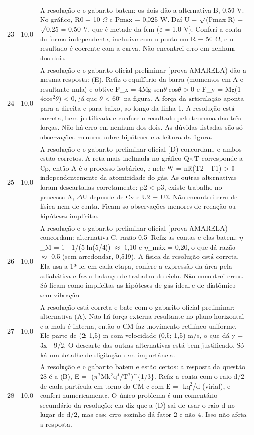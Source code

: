 \documentclass{article}%
\begin{document}
\begin{longtable}{@{}c c p{}@{}}
23 & 10,0 & A resolução e o gabarito batem: os dois dão a alternativa B, 0,50 V. No gráfico, R0 = 10 $\Omega$ e Pmax = 0,025 W. Daí U = $\surd$(Pmax$\cdot$R) = $\surd$0,25 = 0,50 V, que é metade da fem ($\varepsilon$ = 1,0 V). Conferi a conta de forma independente, inclusive com o ponto em R = 50 $\Omega$, e o resultado é coerente com a curva. Não encontrei erro em nenhum dos dois. \\
24 & 10,0 & A resolução e o gabarito oficial preliminar (prova AMARELA) dão a mesma resposta: (E). Refiz o equilíbrio da barra (momentos em A e resultante nula) e obtive F\_x = 4Mg sen$\theta$ cos$\theta$ > 0 e F\_y = Mg(1 - 4cos$^2$$\theta$) < 0, já que $\theta$ < 60$^\circ$ na figura. A força da articulação aponta para a direita e para baixo, ao longo da linha 1. A resolução está correta, bem justificada e confere o resultado pelo teorema das três forças. Não há erro em nenhum dos dois. As dúvidas listadas são só observações menores sobre hipóteses e a leitura da figura. \\
25 & 10,0 & A resolução e o gabarito preliminar oficial (D) concordam, e ambos estão corretos. A reta mais inclinada no gráfico Q$\times$T corresponde a Cp, então A é o processo isobárico, e nele W = nR(T2 - T1) > 0 independentemente da atomicidade do gás. As outras alternativas foram descartadas corretamente: p2 < p3, existe trabalho no processo A, $\Delta$U depende de Cv e U2 = U3. Não encontrei erro de física nem de conta. Ficam só observações menores de redação ou hipóteses implícitas. \\
26 & 10,0 & A resolução e o gabarito preliminar oficial (prova AMARELA) concordam: alternativa C, razão 0,5. Refiz as contas e elas batem: $\eta$\_M = 1 - 1/(5 ln(5/4)) $\approx$ 0,10 e $\eta$\_máx = 0,20, o que dá razão $\approx$ 0,5 (sem arredondar, 0,519). A física da resolução está correta. Ela usa a 1ª lei em cada etapa, confere a expressão da área pela adiabática e faz o balanço de trabalho do ciclo. Não encontrei erros. Só ficam como implícitas as hipóteses de gás ideal e de diatômico sem vibração. \\
27 & 10,0 & A resolução está correta e bate com o gabarito oficial preliminar: alternativa (A). Não há força externa resultante no plano horizontal e a mola é interna, então o CM faz movimento retilíneo uniforme. Ele parte de (2; 1,5) m com velocidade (0,5; 1,5) m/s, o que dá y = 3x - 9/2. O descarte das outras alternativas está bem justificado. Só há um detalhe de digitação sem importância. \\
28 & 10,0 & A resolução e o gabarito batem e estão certos: a resposta da questão 28 é a (B), E = -($\pi$$^2$Mk$^2$q$^{4}$/T$^2$)\^{}\{1/3\}. Refiz a conta com o raio d/2 de cada partícula em torno do CM e com E = -kq$^2$/d (virial), e conferi numericamente. O único problema é um comentário secundário da resolução: ela diz que a (D) sai de usar o raio d no lugar de d/2, mas esse erro sozinho dá fator 2 e não 4. Isso não afeta a resposta. \\

\end{longtable}
\end{document}

